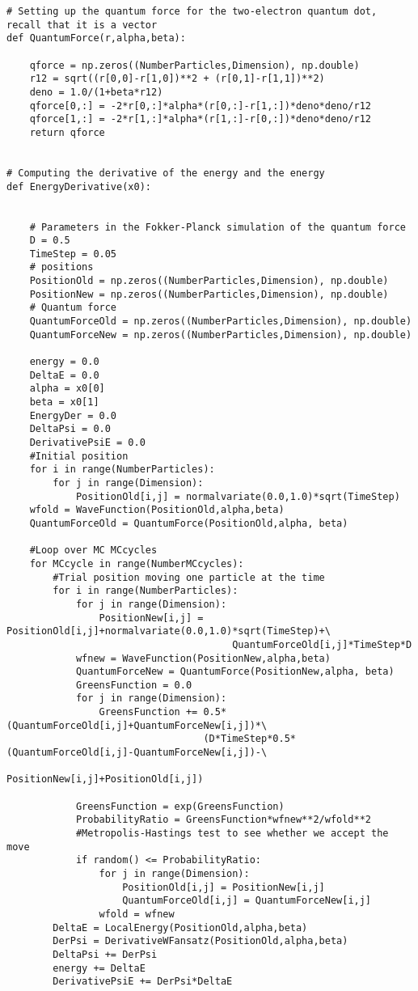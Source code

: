 \documentclass{beamer}
\begin{document}
\begin{frame}
\begin{verbatim}
# Setting up the quantum force for the two-electron quantum dot, recall that it is a vector
def QuantumForce(r,alpha,beta):

    qforce = np.zeros((NumberParticles,Dimension), np.double)
    r12 = sqrt((r[0,0]-r[1,0])**2 + (r[0,1]-r[1,1])**2)
    deno = 1.0/(1+beta*r12)
    qforce[0,:] = -2*r[0,:]*alpha*(r[0,:]-r[1,:])*deno*deno/r12
    qforce[1,:] = -2*r[1,:]*alpha*(r[1,:]-r[0,:])*deno*deno/r12
    return qforce
    

# Computing the derivative of the energy and the energy 
def EnergyDerivative(x0):

    
    # Parameters in the Fokker-Planck simulation of the quantum force
    D = 0.5
    TimeStep = 0.05
    # positions
    PositionOld = np.zeros((NumberParticles,Dimension), np.double)
    PositionNew = np.zeros((NumberParticles,Dimension), np.double)
    # Quantum force
    QuantumForceOld = np.zeros((NumberParticles,Dimension), np.double)
    QuantumForceNew = np.zeros((NumberParticles,Dimension), np.double)

    energy = 0.0
    DeltaE = 0.0
    alpha = x0[0]
    beta = x0[1]
    EnergyDer = 0.0
    DeltaPsi = 0.0
    DerivativePsiE = 0.0 
    #Initial position
    for i in range(NumberParticles):
        for j in range(Dimension):
            PositionOld[i,j] = normalvariate(0.0,1.0)*sqrt(TimeStep)
    wfold = WaveFunction(PositionOld,alpha,beta)
    QuantumForceOld = QuantumForce(PositionOld,alpha, beta)

    #Loop over MC MCcycles
    for MCcycle in range(NumberMCcycles):
        #Trial position moving one particle at the time
        for i in range(NumberParticles):
            for j in range(Dimension):
                PositionNew[i,j] = PositionOld[i,j]+normalvariate(0.0,1.0)*sqrt(TimeStep)+\
                                       QuantumForceOld[i,j]*TimeStep*D
            wfnew = WaveFunction(PositionNew,alpha,beta)
            QuantumForceNew = QuantumForce(PositionNew,alpha, beta)
            GreensFunction = 0.0
            for j in range(Dimension):
                GreensFunction += 0.5*(QuantumForceOld[i,j]+QuantumForceNew[i,j])*\
	                              (D*TimeStep*0.5*(QuantumForceOld[i,j]-QuantumForceNew[i,j])-\
                                      PositionNew[i,j]+PositionOld[i,j])
      
            GreensFunction = exp(GreensFunction)
            ProbabilityRatio = GreensFunction*wfnew**2/wfold**2
            #Metropolis-Hastings test to see whether we accept the move
            if random() <= ProbabilityRatio:
                for j in range(Dimension):
                    PositionOld[i,j] = PositionNew[i,j]
                    QuantumForceOld[i,j] = QuantumForceNew[i,j]
                wfold = wfnew
        DeltaE = LocalEnergy(PositionOld,alpha,beta)
        DerPsi = DerivativeWFansatz(PositionOld,alpha,beta)
        DeltaPsi += DerPsi
        energy += DeltaE
        DerivativePsiE += DerPsi*DeltaE
            

\end{verbatim}
\end{frame}
\end{document}
